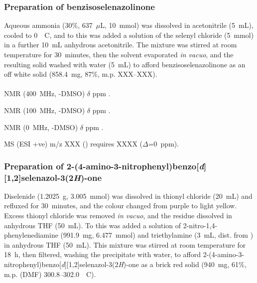 \begin{refsection}
\subsubsection{Preparation of benzisoselenazolinone }
Aqueous ammonia (30\%, 637~$\mu$L, 10~mmol) was dissolved in acetonitrile (5~mL), cooled to 0~\degree~C, and to this was added a solution of the selenyl chloride  (5~mmol) in a further 10~mL anhydrous acetonitrile.
The mixture was stirred at room temperature for 30~minutes, then the solvent evaporated \emph{in vacuo}, and the resulting solid washed with water (5~mL) to afford benzisoselenazolinone  as an off white solid (858.4~mg, 87\%, m.p. XXX--XXX).

\footnotesize\paragraph{}

 NMR (400~MHz, -DMSO) $\delta$ ppm
.

 NMR (100~MHz, -DMSO) $\delta$ ppm
.

 NMR (0~MHz, -DMSO) $\delta$ ppm
.

MS (ESI +ve) m/z XXX ()  requires XXXX ($\Delta$=0~ppm).

\normalsize


\subsubsection[Preparation of \refcmpd{ebs-3no2-4nh2}]{Preparation of 2-(4-amino-3-nitrophenyl)benzo[\emph{d}][1,2]selenazol-3(2\emph{H})-one }
Diselenide  (1.2025~g, 3.005~mmol) was dissolved in thionyl chloride (20~mL) and refluxed for 30~minutes, and the colour changed from purple to light yellow.
Excess thionyl chloride was removed \emph{in vacuo}, and the residue dissolved in anhydrous THF (50~mL).
To this was added a solution of 2-nitro-1,4-phenylenediamine (991.9~mg, 6.477~mmol) and triethylamine (3~mL, dist. from ) in anhydrous THF (50~mL).
This mixture was stirred at room temperature for 18~h, then filtered, washing the precipitate with water, to afford 2-(4-amino-3-nitrophenyl)benzo[\emph{d}][1,2]selenazol-3(2\emph{H})-one  as a brick red solid (940~mg, 61\%, m.p. (DMF) 300.8--302.0~\degree~C).

\footnotesize\paragraph{}


\end{refsection}
